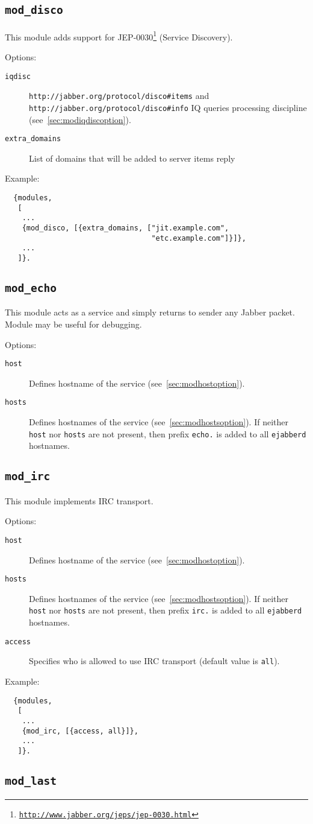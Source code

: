 \documentclass[a4paper,10pt]{article}
\newcommand{\bracehack}{\def\{{\char"7B}\def\}{\char"7D}}
\newcommand{\ns}[1]{\texttt{#1}}
\newcommand{\jid}[1]{\texttt{#1}}
\newcommand{\term}[1]{\texttt{#1}}
\newcommand{\ejabberd}{\texttt{ejabberd}}
\newcommand{\Jabber}{Jabber}
\newcommand{\module}[1]{\texttt{#1}}
\newcommand{\moddisco}{\module{mod\_disco}}
\newcommand{\modirc}{\module{mod\_irc}}
\newcommand{\modlast}{\module{mod\_last}}
\newcommand{\modecho}{\module{mod\_echo}}
\newcommand{\titem}[1]{\item[\bracehack\texttt{#1}]}
\gdef\footahref#1#2{#2\footnote{\href{#1}{\texttt{#1}}}}
\newcommand{\tjepref}[2]{\footahref{http://www.jabber.org/jeps/jep-#1.html}{#2}}
\newcommand{\jepref}[1]{\tjepref{#1}{JEP-#1}}
\newcommand{\iqdiscitem}[1]{\titem{iqdisc} #1 IQ queries processing
discipline (see~\ref{sec:modiqdiscoption}).}
\newcommand{\hostitem}[1]{
  \titem{host} Defines hostname of the service
  (see~\ref{sec:modhostoption}).
  \titem{hosts} Defines hostnames of the service
  (see~\ref{sec:modhostsoption}).  If neither \texttt{host} nor \texttt{hosts}
  are not present, then prefix \jid{#1.} is added to all \ejabberd{} hostnames.
}
\begin{document}
\subsection{\moddisco{}}
\label{sec:moddisco}

This module adds support for \jepref{0030} (Service Discovery).

Options:
\begin{description}
\iqdiscitem{\ns{http://jabber.org/protocol/disco\#items} and
  \ns{http://jabber.org/protocol/disco\#info}}
\titem{extra\_domains} List of domains that will be added to server
  items reply
\end{description}

Example:
\begin{verbatim}
  {modules,
   [
    ...
    {mod_disco, [{extra_domains, ["jit.example.com",
                                  "etc.example.com"]}]},
    ...
   ]}.
\end{verbatim}


\subsection{\modecho{}}
\label{sec:modecho}

This module acts as a service and simply returns to sender any \Jabber{} packet. Module may be
useful for debugging.

Options:
\begin{description}
\hostitem{echo}
\end{description}


\subsection{\modirc{}}
\label{sec:modirc}

This module implements IRC transport.

Options:
\begin{description}
\hostitem{irc}
\titem{access} Specifies who is allowed to use IRC transport (default value is \term{all}).
\end{description}

Example:
\begin{verbatim}
  {modules,
   [
    ...
    {mod_irc, [{access, all}]},
    ...
   ]}.
\end{verbatim}


\subsection{\modlast{}}
\label{sec:modlast}
\end{document}
